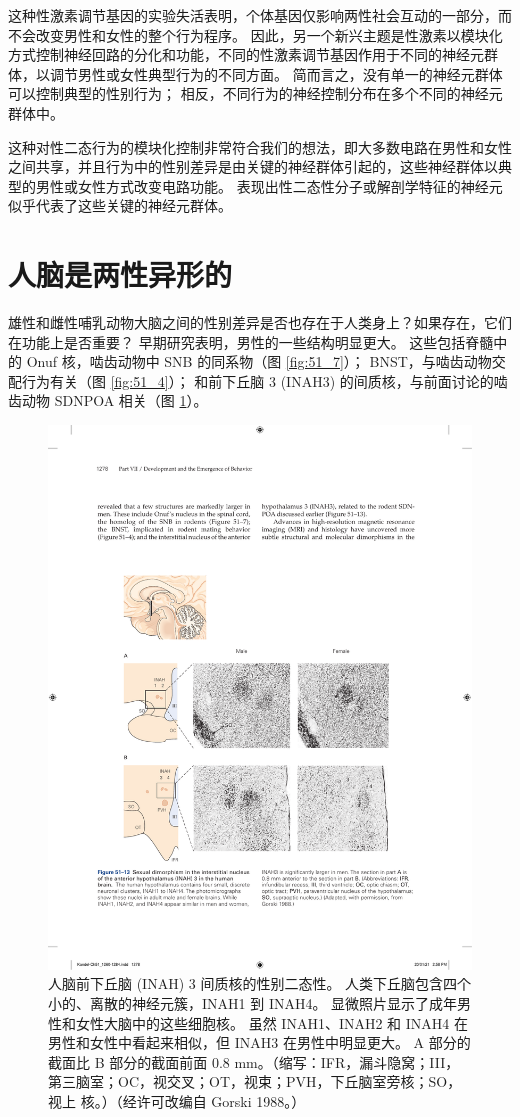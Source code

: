 这种性激素调节基因的实验失活表明，个体基因仅影响两性社会互动的一部分，而不会改变男性和女性的整个行为程序。 因此，另一个新兴主题是性激素以模块化方式控制神经回路的分化和功能，不同的性激素调节基因作用于不同的神经元群体，以调节男性或女性典型行为的不同方面。 简而言之，没有单一的神经元群体可以控制典型的性别行为； 相反，不同行为的神经控制分布在多个不同的神经元群体中。

这种对性二态行为的模块化控制非常符合我们的想法，即大多数电路在男性和女性之间共享，并且行为中的性别差异是由关键的神经群体引起的，这些神经群体以典型的男性或女性方式改变电路功能。 表现出性二态性分子或解剖学特征的神经元似乎代表了这些关键的神经元群体。

\section{人脑是两性异形的}

雄性和雌性哺乳动物大脑之间的性别差异是否也存在于人类身上？如果存在，它们在功能上是否重要？ 早期研究表明，男性的一些结构明显更大。 这些包括脊髓中的 Onuf 核，啮齿动物中 SNB 的同系物（图 \ref{fig:51_7}）； BNST，与啮齿动物交配行为有关（图 \ref{fig:51_4}）； 和前下丘脑 3 (INAH3) 的间质核，与前面讨论的啮齿动物 SDNPOA 相关（图 \ref{fig:51_13}）。

\begin{figure}[htbp]
	\centering
	\includegraphics[width=0.8\linewidth]{chap51/fig_51_13}
	\caption{人脑前下丘脑 (INAH) 3 间质核的性别二态性。 人类下丘脑包含四个小的、离散的神经元簇，INAH1 到 INAH4。 显微照片显示了成年男性和女性大脑中的这些细胞核。 虽然 INAH1、INAH2 和 INAH4 在男性和女性中看起来相似，但 INAH3 在男性中明显更大。 A 部分的截面比 B 部分的截面前面 0.8 mm。（缩写：IFR，漏斗隐窝；III，第三脑室；OC，视交叉；OT，视束；PVH，下丘脑室旁核；SO，视上 核。）（经许可改编自 Gorski 1988。）}
	\label{fig:51_13}
\end{figure}

